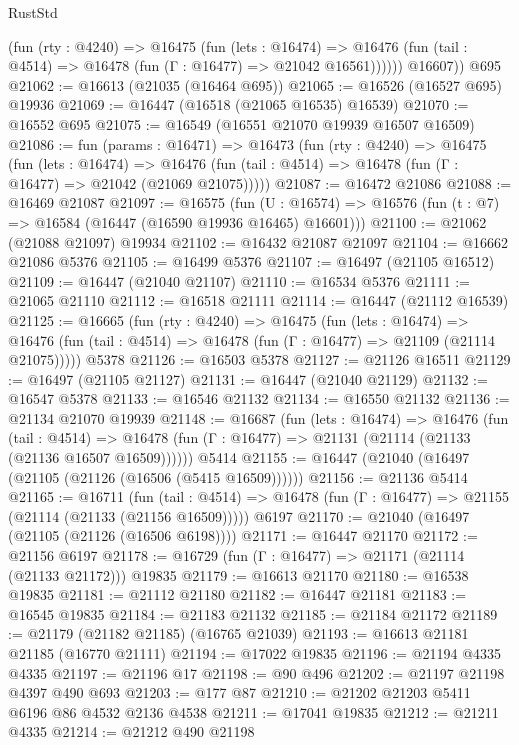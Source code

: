 \begin{lexlean}{RustStd}
\begin{coremodule}
            (fun (rty : @4240) =>
            @16475
              (fun (lets : @16474) =>
              @16476 (fun (tail : @4514) => @16478 (fun (Γ : @16477) => @21042 @16561))))))
        @16607))
    @695
@21062 := @16613 (@21035 (@16464 @695))
@21065 := @16526 (@16527 @695) @19936
@21069 := @16447 (@16518 (@21065 @16535) @16539)
@21070 := @16552 @695
@21075 := @16549 (@16551 @21070 @19939 @16507 @16509)
@21086 := fun (params : @16471) =>
  @16473
    (fun (rty : @4240) =>
    @16475
      (fun (lets : @16474) =>
      @16476 (fun (tail : @4514) => @16478 (fun (Γ : @16477) => @21042 (@21069 @21075)))))
@21087 := @16472 @21086
@21088 := @16469 @21087
@21097 := @16575
    (fun (U : @16574) => @16576 (fun (t : @7) => @16584 (@16447 (@16590 @19936 @16465) @16601)))
@21100 := @21062 (@21088 @21097) @19934
@21102 := @16432 @21087 @21097
@21104 := @16662 @21086 @5376
@21105 := @16499 @5376
@21107 := @16497 (@21105 @16512)
@21109 := @16447 (@21040 @21107)
@21110 := @16534 @5376
@21111 := @21065 @21110
@21112 := @16518 @21111
@21114 := @16447 (@21112 @16539)
@21125 := @16665
    (fun (rty : @4240) =>
    @16475
      (fun (lets : @16474) =>
      @16476 (fun (tail : @4514) => @16478 (fun (Γ : @16477) => @21109 (@21114 @21075)))))
    @5378
@21126 := @16503 @5378
@21127 := @21126 @16511
@21129 := @16497 (@21105 @21127)
@21131 := @16447 (@21040 @21129)
@21132 := @16547 @5378
@21133 := @16546 @21132
@21134 := @16550 @21132
@21136 := @21134 @21070 @19939
@21148 := @16687
    (fun (lets : @16474) =>
    @16476
      (fun (tail : @4514) =>
      @16478 (fun (Γ : @16477) => @21131 (@21114 (@21133 (@21136 @16507 @16509))))))
    @5414
@21155 := @16447 (@21040 (@16497 (@21105 (@21126 (@16506 (@5415 @16509))))))
@21156 := @21136 @5414
@21165 := @16711
    (fun (tail : @4514) => @16478 (fun (Γ : @16477) => @21155 (@21114 (@21133 (@21156 @16509)))))
    @6197
@21170 := @21040 (@16497 (@21105 (@21126 (@16506 @6198))))
@21171 := @16447 @21170
@21172 := @21156 @6197
@21178 := @16729 (fun (Γ : @16477) => @21171 (@21114 (@21133 @21172))) @19835
@21179 := @16613 @21170
@21180 := @16538 @19835
@21181 := @21112 @21180
@21182 := @16447 @21181
@21183 := @16545 @19835
@21184 := @21183 @21132
@21185 := @21184 @21172
@21189 := @21179 (@21182 @21185) (@16765 @21039)
@21193 := @16613 @21181 @21185 (@16770 @21111)
@21194 := @17022 @19835
@21196 := @21194 @4335 @4335
@21197 := @21196 @17
@21198 := @90 @496
@21202 := @21197 @21198 @4397 @490 @693
@21203 := @177 @87
@21210 := @21202 @21203 @5411 @6196 @86 @4532 @2136 @4538
@21211 := @17041 @19835
@21212 := @21211 @4335
@21214 := @21212 @490 @21198

\end{coremodule}
\end{lexlean}
